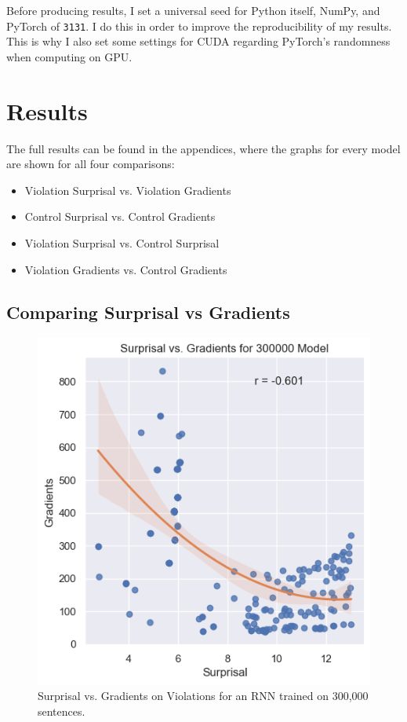 \documentclass{IEEEtran}
\begin{document}
Before producing results, I set a universal seed for Python itself, NumPy, and PyTorch of \texttt{3131}.
I do this in order to improve the reproducibility of my results.
This is why I also set some settings for CUDA regarding PyTorch's randomness when computing on GPU.

\section{Results}
The full results can be found in the appendices, where the graphs for every model are shown for all four comparisons:
\begin{itemize}
    \item Violation Surprisal vs. Violation Gradients
    \item Control Surprisal vs. Control Gradients
    \item Violation Surprisal vs. Control Surprisal
    \item Violation Gradients vs. Control Gradients
\end{itemize}

\subsection{Comparing Surprisal vs Gradients}
\begin{figure}
    \centering
    \includegraphics[width=.45\textwidth]{violations_surprisal_vs_gradients/300000.png}
    \caption{Surprisal vs. Gradients on Violations for an RNN trained on 300,000 sentences.}
    \label{fig:300000_surprisal_vs_gradients}
\end{figure}
\end{document}
